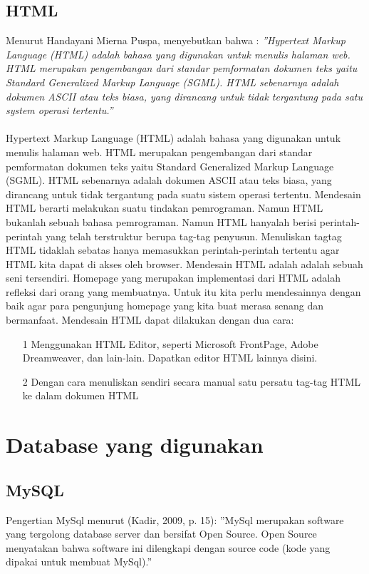 \documentclass{jtetiproposalskripsi}
\begin{document}
\subsection{HTML}
Menurut Handayani Mierna Puspa, menyebutkan bahwa : 
\textit{''Hypertext Markup Language (HTML) adalah bahasa yang digunakan untuk menulis halaman  web. HTML merupakan pengembangan  dari  standar pemformatan dokumen  teks  yaitu Standard Generalized Markup Language (SGML). HTML sebenarnya adalah dokumen ASCII atau teks biasa,  yang dirancang untuk tidak tergantung pada satu system operasi tertentu.''}

\paragraph{}
Hypertext  Markup Language (HTML) adalah  bahasa  yang  digunakan untuk menulis halaman web. HTML merupakan pengembangan dari standar pemformatan  dokumen teks yaitu Standard Generalized Markup  Language (SGML).  HTML  sebenarnya adalah dokumen  ASCII  atau  teks  biasa,  yang dirancang untuk tidak tergantung pada suatu sistem operasi tertentu. Mendesain  HTML  berarti  melakukan  suatu  tindakan  pemrograman. Namun HTML  bukanlah  sebuah  bahasa  pemrograman.  Namun  HTML hanyalah  berisi perintah-perintah yang telah terstruktur berupa tag-tag penyusun. Menuliskan tagtag  HTML  tidaklah  sebatas  hanya  memasukkan perintah-perintah  tertentu  agar HTML kita dapat di akses oleh browser. Mendesain HTML adalah adalah sebuah seni  tersendiri.  Homepage  yang merupakan  implementasi  dari  HTML  adalah refleksi dari orang yang membuatnya. Untuk itu kita perlu mendesainnya dengan baik agar para pengunjung  homepage  yang  kita  buat  merasa  senang  dan bermanfaat. 
Mendesain  HTML  dapat  dilakukan  dengan  dua  cara: 
\begin{itemize}
\item[1]Menggunakan  HTML  Editor,  seperti  Microsoft  FrontPage,  Adobe Dreamweaver,  dan  lain-lain.  Dapatkan  editor  HTML  lainnya  disini. 
\item[2]Dengan cara menuliskan sendiri secara manual satu persatu tag-tag HTML ke dalam dokumen HTML
\end{itemize}

\section{Database yang digunakan}
\subsection{MySQL}
Pengertian  MySql  menurut  (Kadir,  2009,  p.  15):
''MySql  merupakan software yang tergolong  database  server  dan bersifat Open  Source.  Open  Source menyatakan bahwa  software  ini dilengkapi  dengan  source  code  (kode  yang dipakai  untuk  membuat MySql).''
\end{document}
